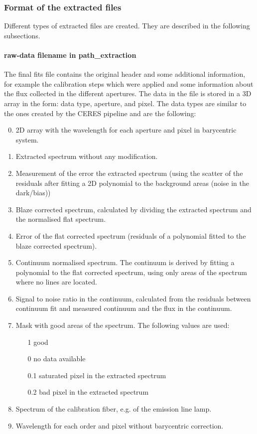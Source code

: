 \documentclass[10pt,a4paper]{article}
\begin{document}
\subsubsection{Format of the extracted files}
Different types of extracted files are created. They are described in the following subsections.

\paragraph{raw-data filename in path\_extraction}
\label{section:extraction_data_format}
The final fits file contains the original header and some additional information, for example the calibration steps which were applied and some information about the flux collected in the different apertures. The data in the file is stored in a 3D array in the form: data type, aperture, and pixel. The data types are similar to the ones created by the CERES pipeline and are the following:
\begin{enumerate}
  \setcounter{enumi}{-1}
  \item 2D array with the wavelength for each aperture and pixel in barycentric system.
  \item Extracted spectrum without any modification.
  \item Measurement of the error the extracted spectrum (using the scatter of the residuals after fitting a 2D polynomial to the background areas (noise in the dark/bias))
  \item Blaze corrected spectrum, calculated by dividing the extracted spectrum and the normalised flat spectrum.
  \item Error of the flat corrected spectrum (residuals of a polynomial fitted to the blaze corrected spectrum).
  \item Continuum normalised spectrum. The continuum is derived by fitting a polynomial to the flat corrected spectrum, using only areas of the spectrum where no lines are located. 
  \item Signal to noise ratio in the continuum, calculated from the residuals between continuum fit and measured continuum and the flux in the continuum.
  \item Mask with good areas of the spectrum. The following values are used:
  \begin{itemize}
    \item[1] good
    \item[0] no data available
    \item[0.1] saturated pixel in the extracted spectrum
    \item[0.2] bad pixel in the extracted spectrum
  \end{itemize}
  \item Spectrum of the calibration fiber, e.g. of the emission line lamp.
  \item Wavelength for each order and pixel without barycentric correction.
\end{enumerate}
\end{document}
